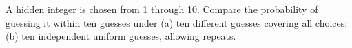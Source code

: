 A hidden integer is chosen from 1 through 10. Compare the probability of guessing it within ten guesses under (a) ten different guesses covering all choices; (b) ten independent uniform guesses, allowing repeats.
